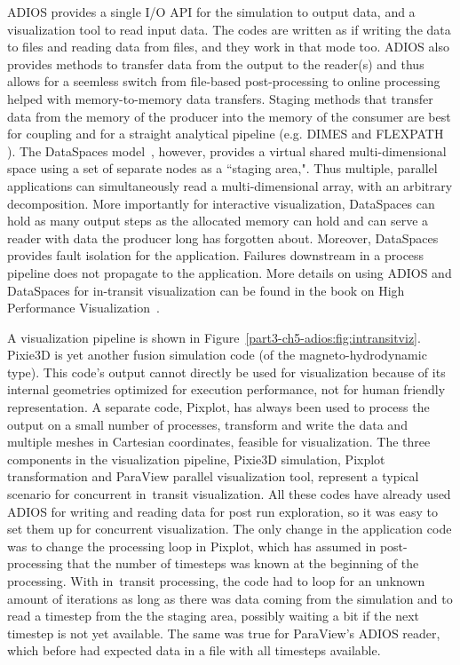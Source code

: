 
ADIOS provides a single I/O API for the simulation to output data, and a visualization tool to read input data. The codes are written as if writing the data to files and reading data from files, and they work in that mode too. ADIOS also provides methods to transfer data from the output to the reader(s) and thus allows for a seemless switch from file-based post-processing to online processing helped with memory-to-memory data transfers. Staging methods that transfer data from the memory of the producer into the memory of the consumer are best for coupling and for a straight analytical pipeline (e.g. DIMES \cite{ADIOS:DIMES-XXX} and FLEXPATH \cite{ADIOS:FLEXPATH-XXX}). The DataSpaces model~\cite{ADIOS:Docan:hpdc10}, however, provides a virtual shared multi-dimensional space using a set of separate nodes as a ``staging area,". Thus multiple, parallel applications can simultaneously read a multi-dimensional array, with an arbitrary decomposition. More importantly for interactive visualization, DataSpaces can hold as many output steps as the allocated memory can hold and can serve a reader with data the producer long has forgotten about. Moreover, DataSpaces provides fault isolation for the application. Failures downstream in a process pipeline does not propagate to the application. More details on using ADIOS and DataSpaces for in-transit visualization can be found in the book on High Performance Visualization~\cite{ADIOS:Bethel-Childs-Hansen:HPV:2012}.

A visualization pipeline is shown in Figure~\ref{part3-ch5-adios:fig:intransitviz}. Pixie3D \cite{ADIOS:Chacon:2002} is yet another fusion simulation code (of the magneto-hydrodynamic type). This code's output cannot directly be used for visualization because of its internal geometries optimized for execution performance, not for human friendly representation. A separate code, Pixplot, has always been used to process the output on a small number of processes, transform and write the data and multiple meshes in Cartesian coordinates, feasible for visualization. The three components in the visualization pipeline, Pixie3D simulation, Pixplot transformation and ParaView parallel visualization tool, represent a typical scenario for concurrent in~transit visualization. All these codes have already used ADIOS for writing and reading data for post run exploration, so it was easy to set them up for concurrent visualization. The only change in the application code was to change the processing loop in Pixplot, which has assumed in post-processing that the number of timesteps was known at the beginning of the processing. With in~transit processing, the code had to loop for an unknown amount of iterations as long as there was data coming from the simulation and to read a timestep from the the staging area, possibly waiting a bit if the next timestep is not yet available. The same was true for ParaView's ADIOS reader, which before had expected data in a file with all timesteps available.  

